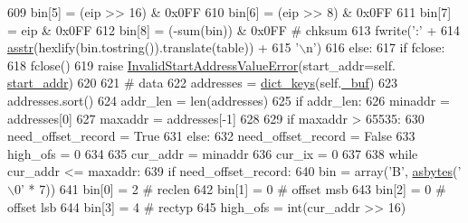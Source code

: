 \begin{DoxyCode}
609                 bin[5] = (eip >> 16) & 0x0FF
610                 bin[6] = (eip >> 8) & 0x0FF
611                 bin[7] = eip & 0x0FF
612                 bin[8] = (-sum(bin)) & 0x0FF  \textcolor{comment}{# chksum}
613                 fwrite(\textcolor{stringliteral}{':'} +
614                        \hyperlink{namespacesoftware_1_1chipwhisperer_1_1capture_1_1utils_1_1IntelHex_a32eb6deeafe6dba1f76d94543cff7528}{asstr}(hexlify(bin.tostring()).translate(table)) +
615                        \textcolor{stringliteral}{'\(\backslash\)n'})
616             \textcolor{keywordflow}{else}:
617                 \textcolor{keywordflow}{if} fclose:
618                     fclose()
619                 \textcolor{keywordflow}{raise} \hyperlink{classsoftware_1_1chipwhisperer_1_1capture_1_1utils_1_1IntelHex_1_1InvalidStartAddressValueError}{InvalidStartAddressValueError}(start\_addr=self.
      \hyperlink{classsoftware_1_1chipwhisperer_1_1capture_1_1utils_1_1IntelHex_1_1IntelHex_a5da95579a9d232f27b10682ef2422316}{start\_addr})
620 
621         \textcolor{comment}{# data}
622         addresses = \hyperlink{namespacesoftware_1_1chipwhisperer_1_1capture_1_1utils_1_1IntelHex_a675ad269e4a9a3ee5a5b4b413d0fb690}{dict\_keys}(self.\hyperlink{classsoftware_1_1chipwhisperer_1_1capture_1_1utils_1_1IntelHex_1_1IntelHex_a9acc18c6165db7a6540c07688a8e09ac}{\_buf})
623         addresses.sort()
624         addr\_len = len(addresses)
625         \textcolor{keywordflow}{if} addr\_len:
626             minaddr = addresses[0]
627             maxaddr = addresses[-1]
628 
629             \textcolor{keywordflow}{if} maxaddr > 65535:
630                 need\_offset\_record = \textcolor{keyword}{True}
631             \textcolor{keywordflow}{else}:
632                 need\_offset\_record = \textcolor{keyword}{False}
633             high\_ofs = 0
634 
635             cur\_addr = minaddr
636             cur\_ix = 0
637 
638             \textcolor{keywordflow}{while} cur\_addr <= maxaddr:
639                 \textcolor{keywordflow}{if} need\_offset\_record:
640                     bin = array(\textcolor{stringliteral}{'B'}, \hyperlink{namespacesoftware_1_1chipwhisperer_1_1capture_1_1utils_1_1IntelHex_a7f086f0677c4876409244a91e386b8cc}{asbytes}(\textcolor{stringliteral}{'\(\backslash\)0'} * 7))
641                     bin[0] = 2  \textcolor{comment}{# reclen}
642                     bin[1] = 0  \textcolor{comment}{# offset msb}
643                     bin[2] = 0  \textcolor{comment}{# offset lsb}
644                     bin[3] = 4  \textcolor{comment}{# rectyp}
645                     high\_ofs = int(cur\_addr >> 16)

\end{DoxyCode}
